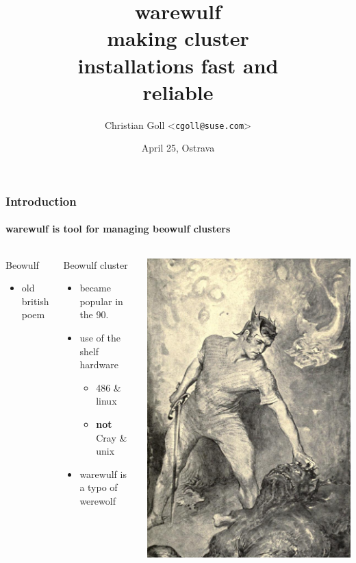 \documentclass[aspectratio=169]{beamer}
\title{warewulf\\
making cluster\\
installations fast and \\
reliable}
\date{April 25, Ostrava}
\author{Christian Goll <\texttt{cgoll@suse.com}>}
\begin{document}
\begin{frame}
\titlepage
\end{frame}
\begin{frame}[fragile]
\frametitle{Introduction}
\framesubtitle{warewulf is tool for managing beowulf clusters}
\begin{columns}
\begin{block}{Beowulf}
  \begin{itemize}
    \item old british poem
  \end{itemize}
\end{block}
\begin{block}{Beowulf cluster}
  \begin{itemize}
    \item became popular in the 90.
    \item use of the shelf hardware
    \begin{itemize}
      \item 486 \& linux
      \item \textbf{not} Cray \& unix
    \end{itemize}
    \item warewulf is a typo of werewolf
  \end{itemize}
\end{block}
  \includegraphics[width=.6\linewidth]{Beowulf}
\end{columns}
\end{frame}
\end{document}
